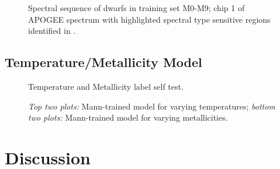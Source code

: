 \documentclass[modern]{aastex62}
\begin{document}
\begin{figure}[ht]
\caption{ Spectral sequence of dwarfs in training set M0-M9; chip 1 of APOGEE
spectrum with highlighted spectral type sensitive regions identified in \citealt{Desphande:2013}.}
\end{figure}



\subsection{Temperature/Metallicity Model}
\begin{figure}[ht]
\caption{Temperature and Metallicity label self test.}
\end{figure}

\begin{figure}[ht]
\caption{\textit{Top two plots:} Mann-trained model for varying temperatures; \textit{bottom two plots:} Mann-trained model for varying metallicities.}
\end{figure}


\section{Discussion} \label{sec:discussion}
\end{document}
